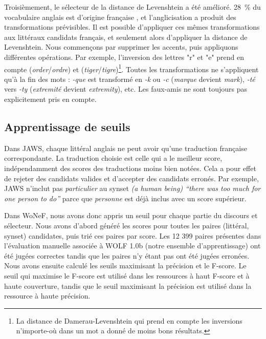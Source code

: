 Troisièmement, le sélecteur de la distance de Levenshtein a été amélioré. 28~\% du vocabulaire anglais est d'origine française \citep{finkenstaedt1973ordered}, et l'anglicisation a produit des transformations prévisibles. Il est possible d'appliquer ces mêmes transformations aux littéraux candidats français, et seulement alors d'appliquer la distance de Levenshtein. Nous commençons par supprimer les accents, puis appliquons différentes opérations. Par exemple, l'inversion des lettres "r" et "e" prend en compte (\textit{order}/\textit{ordre}) et (\textit{tiger}/\textit{tigre})\footnote{La distance de Damerau-Levenshtein qui prend en compte les inversions n'importe-où dans un mot \citep{damerau1964technique} a donné de moins bons résultats.}. Toutes les transformations ne s'appliquent qu'à la fin des mots : \textit{-que} est transformé en \textit{-k} ou \textit{-c} (\textit{marque} devient \textit{mark}), \textit{-té} vers \textit{-ty} (\textit{extremité} devient \textit{extremity}), etc. Les faux-amis ne sont toujours pas explicitement pris en compte.

\subsection{Apprentissage de seuils}
\label{subsec:learning_thresholds}

Dans JAWS, chaque littéral anglais ne peut avoir qu'une traduction française correspondante. La traduction choisie est celle qui a le meilleur score, indépendamment des scores des traductions moins bien notées. Cela a pour effet de rejeter des candidats valides et d'accepter des candidats erronés. Par exemple, JAWS n'inclut pas \textit{particulier} au synset \textit{(a human being) ``there was too much for one person to do''} parce que \textit{personne} est déjà inclus avec un score supérieur.

Dans WoNeF, nous avons donc appris un seuil pour chaque partie du discours et sélecteur. Nous avons d'abord généré les scores pour toutes les paires (littéral, synset) candidates, puis trié ces paires par score. Les 12 399 paires présentes dans l'évaluation manuelle associée à WOLF 1.0b (notre ensemble d'apprentissage) ont été jugées correctes tandis que les paires n'y étant pas ont été jugées erronées. Nous avons ensuite calculé les seuils maximisant la précision et le F-score. Le seuil qui maximise le F-score est utilisé dans les ressources à haut F-score et à haute couverture, tandis que le seuil maximisant la précision est utilisé dans la ressource à haute précision.

